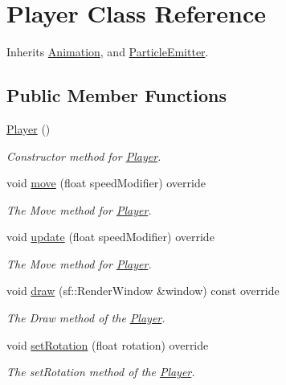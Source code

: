 \hypertarget{class_player}{\section{Player Class Reference}
\label{class_player}
}


Inherits \hyperlink{class_animation}{Animation}, and \hyperlink{class_particle_emitter}{Particle\+Emitter}.

\subsection*{Public Member Functions}
\begin{DoxyCompactItemize}
\item 
\hyperlink{class_player_affe0cc3cb714f6deb4e62f0c0d3f1fd8}{Player} ()
\begin{DoxyCompactList}\small\item\em Constructor method for \hyperlink{class_player}{Player}. \end{DoxyCompactList}\item 
void \hyperlink{class_player_a79a7509b3cde94c77b79247fa46b13dd}{move} (float speed\+Modifier) override
\begin{DoxyCompactList}\small\item\em The Move method for \hyperlink{class_player}{Player}. \end{DoxyCompactList}\item 
void \hyperlink{class_player_a70e7b6ef62c5b8080e454edcb15cacc8}{update} (float speed\+Modifier) override
\begin{DoxyCompactList}\small\item\em The Move method for \hyperlink{class_player}{Player}. \end{DoxyCompactList}\item 
void \hyperlink{class_player_a5e0147aee1248db63417987b9a203a9a}{draw} (sf\+::\+Render\+Window \&window) const override
\begin{DoxyCompactList}\small\item\em The Draw method of the \hyperlink{class_player}{Player}. \end{DoxyCompactList}\item 
void \hyperlink{class_player_af81c4b00747424065dae4984f4f6c57e}{set\+Rotation} (float rotation) override
\begin{DoxyCompactList}\small\item\em The set\+Rotation method of the \hyperlink{class_player}{Player}. \end{DoxyCompactList}\item 

\end{DoxyCompactItemize}

